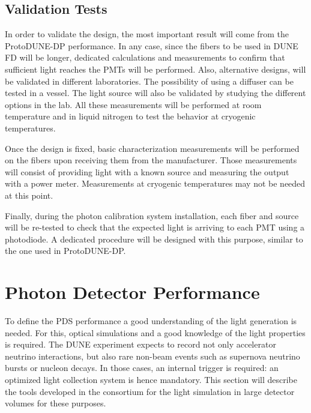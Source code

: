 \subsection{Validation Tests}
\label{sec:fddp-pd-5.2}

In order to validate the design, the most important result will come from the ProtoDUNE-DP performance. In any case, since the fibers to be used in DUNE FD will be longer, dedicated calculations and measurements to confirm that sufficient light reaches the PMTs will be performed. Also, alternative designs, will be validated in different laboratories. The possibility of using a diffuser can be tested in a vessel. The light source will also be validated by studying the different options in the lab. All these measurements will be performed at room temperature and in liquid nitrogen to test the behavior at cryogenic temperatures.

Once the design is fixed, basic characterization measurements will be performed on the fibers upon receiving them from the manufacturer. Those measurements will consist of providing light with a known source and measuring the output with a power meter. Measurements at cryogenic temperatures may not be needed at this point.

Finally, during the photon calibration system installation, each fiber and source will be re-tested to check that the expected light is arriving to each PMT using a photodiode. A dedicated procedure will be designed with this purpose, similar to the one used in ProtoDUNE-DP.

\section{Photon Detector Performance}
\label{sec:fddp-pd-6}

To define the PDS performance a good understanding of the light generation is needed. For this, optical simulations and a good knowledge of the light properties is required. The DUNE experiment expects to record not only accelerator neutrino interactions, but also rare non-beam events such as supernova neutrino bursts or nucleon decays. In those cases, an internal trigger is required: an optimized light collection system is hence mandatory. This section will describe the tools developed in the consortium for the light simulation in large detector volumes for these purposes.

